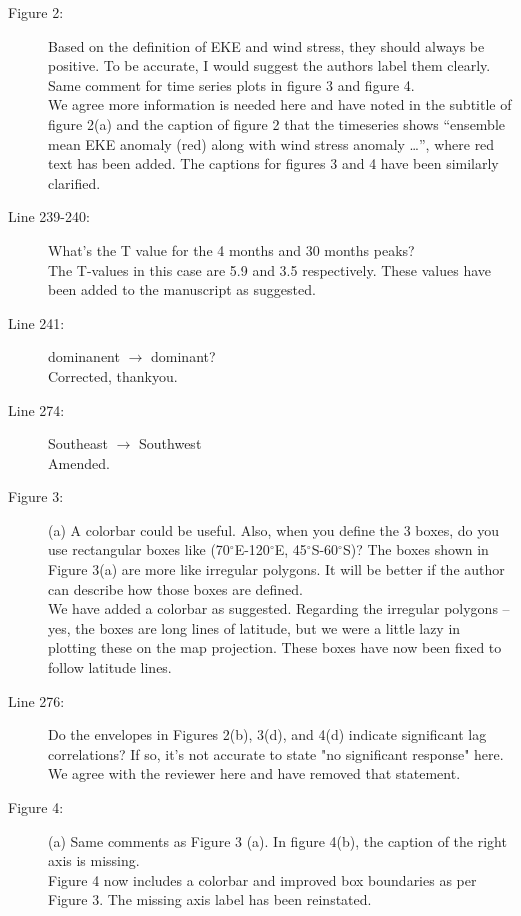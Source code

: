 \documentclass[11pt]{article}
\begin{document}
{\begin{description}
\item[Figure 2:] Based on the definition of EKE and wind stress, they should always be positive. To be accurate, I would suggest the authors label them clearly. Same comment for time series plots in figure 3 and figure 4. \\
{\color{black} We agree more information is needed here and have noted in the subtitle of figure 2(a) and the caption of figure 2 that the timeseries shows ``ensemble mean {\color{red}EKE anomaly} (red) along with wind stress {\color{red}anomaly} \ldots'', where red text has been added. 
The captions for figures 3 and 4 have been similarly clarified.}

\item[Line 239-240:] What's the T value for the 4 months and 30 months peaks? \\
{\color{black} The T-values in this case are 5.9 and 3.5 respectively. 
These values have been added to the manuscript as suggested.  }

\item[Line 241:] dominanent $\to$ dominant?\\
{\color{black} Corrected, thankyou. }

\item[Line 274:] Southeast $\to$ Southwest\\
{\color{black} Amended. }

\item[Figure 3:] (a) A colorbar could be useful. Also, when you define the 3 boxes, do you use rectangular boxes like (70$^\circ$E-120$^\circ$E, 45$^\circ$S-60$^\circ$S)? The boxes shown in Figure 3(a) are more like irregular polygons. It will be better if the author can describe how those boxes are defined. \\
{\color{black}  We have added a colorbar as suggested. Regarding the irregular polygons -- yes, the boxes are long lines of latitude, but we were a little lazy in plotting these on the map projection. These boxes have now been fixed to follow latitude lines. }

\item[Line 276:] Do the envelopes in Figures 2(b), 3(d), and 4(d) indicate significant lag correlations? If so, it's not accurate to state "no significant response" here.\\
{\color{black} We agree with the reviewer here and have removed that statement. }

\item[Figure 4:] (a) Same comments as Figure 3 (a). In figure 4(b), the caption of the right axis is missing. \\
{\color{black}  Figure 4 now includes a colorbar and improved box boundaries as per Figure 3.
The missing axis label has been reinstated.}


\end{description}}
\end{document}
